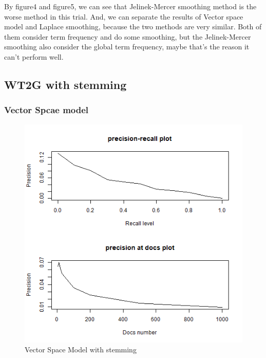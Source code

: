 \documentclass[a4pper,11pt,onecolumn]{article}
\begin{document}
By figure4 and figure5, we can see that Jelinek-Mercer smoothing method is the worse method in this trial. And, we can separate the results of Vector space model and Laplace smoothing, because the two methods are very similar. Both of them consider term frequency and do some smoothing, but the Jelinek-Mercer smoothing also consider the global term frequency, maybe that's the reason it can't perform well.

\subsection{WT2G with stemming}

\subsubsection{Vector Spcae model}
\begin{figure}[H]
\caption{Vector Space Model with stemming}
\includegraphics[scale = 0.6]{model1.png}
\centering
\end{figure}
\end{document}

